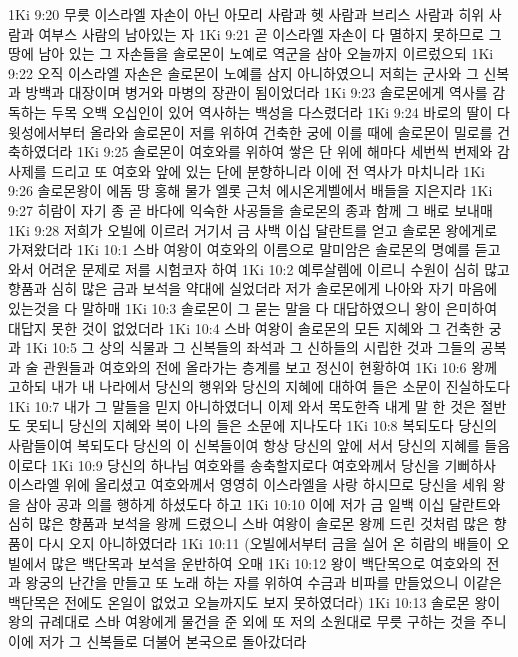1Ki 9:20  무릇 이스라엘 자손이 아닌 아모리 사람과 헷 사람과 브리스 사람과 히위 사람과 여부스 사람의 남아있는 자
1Ki 9:21  곧 이스라엘 자손이 다 멸하지 못하므로 그 땅에 남아 있는 그 자손들을 솔로몬이 노예로 역군을 삼아 오늘까지 이르렀으되
1Ki 9:22  오직 이스라엘 자손은 솔로몬이 노예를 삼지 아니하였으니 저희는 군사와 그 신복과 방백과 대장이며 병거와 마병의 장관이 됨이었더라
1Ki 9:23  솔로몬에게 역사를 감독하는 두목 오백 오십인이 있어 역사하는 백성을 다스렸더라
1Ki 9:24  바로의 딸이 다윗성에서부터 올라와 솔로몬이 저를 위하여 건축한 궁에 이를 때에 솔로몬이 밀로를 건축하였더라
1Ki 9:25  솔로몬이 여호와를 위하여 쌓은 단 위에 해마다 세번씩 번제와 감사제를 드리고 또 여호와 앞에 있는 단에 분향하니라 이에 전 역사가 마치니라
1Ki 9:26  솔로몬왕이 에돔 땅 홍해 물가 엘롯 근처 에시온게벨에서 배들을 지은지라
1Ki 9:27  히람이 자기 종 곧 바다에 익숙한 사공들을 솔로몬의 종과 함께 그 배로 보내매
1Ki 9:28  저희가 오빌에 이르러 거기서 금 사백 이십 달란트를 얻고 솔로몬 왕에게로 가져왔더라
1Ki 10:1  스바 여왕이 여호와의 이름으로 말미암은 솔로몬의 명예를 듣고 와서 어려운 문제로 저를 시험코자 하여
1Ki 10:2  예루살렘에 이르니 수원이 심히 많고 향품과 심히 많은 금과 보석을 약대에 실었더라 저가 솔로몬에게 나아와 자기 마음에 있는것을 다 말하매
1Ki 10:3  솔로몬이 그 묻는 말을 다 대답하였으니 왕이 은미하여 대답지 못한 것이 없었더라
1Ki 10:4  스바 여왕이 솔로몬의 모든 지혜와 그 건축한 궁과
1Ki 10:5  그 상의 식물과 그 신복들의 좌석과 그 신하들의 시립한 것과 그들의 공복과 술 관원들과 여호와의 전에 올라가는 층계를 보고 정신이 현황하여
1Ki 10:6  왕께 고하되 내가 내 나라에서 당신의 행위와 당신의 지혜에 대하여 들은 소문이 진실하도다
1Ki 10:7  내가 그 말들을 믿지 아니하였더니 이제 와서 목도한즉 내게 말 한 것은 절반도 못되니 당신의 지혜와 복이 나의 들은 소문에 지나도다
1Ki 10:8  복되도다 당신의 사람들이여 복되도다 당신의 이 신복들이여 항상 당신의 앞에 서서 당신의 지혜를 들음이로다
1Ki 10:9  당신의 하나님 여호와를 송축할지로다 여호와께서 당신을 기뻐하사 이스라엘 위에 올리셨고 여호와께서 영영히 이스라엘을 사랑 하시므로 당신을 세워 왕을 삼아 공과 의를 행하게 하셨도다 하고
1Ki 10:10  이에 저가 금 일백 이십 달란트와 심히 많은 향품과 보석을 왕께 드렸으니 스바 여왕이 솔로몬 왕께 드린 것처럼 많은 향품이 다시 오지 아니하였더라
1Ki 10:11  (오빌에서부터 금을 실어 온 히람의 배들이 오빌에서 많은 백단목과 보석을 운반하여 오매
1Ki 10:12  왕이 백단목으로 여호와의 전과 왕궁의 난간을 만들고 또 노래 하는 자를 위하여 수금과 비파를 만들었으니 이같은 백단목은 전에도 온일이 없었고 오늘까지도 보지 못하였더라)
1Ki 10:13  솔로몬 왕이 왕의 규례대로 스바 여왕에게 물건을 준 외에 또 저의 소원대로 무릇 구하는 것을 주니 이에 저가 그 신복들로 더불어 본국으로 돌아갔더라
